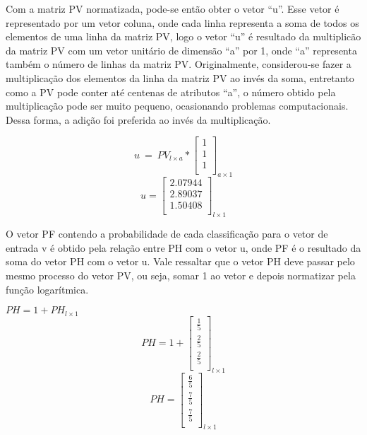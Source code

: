 \begin{anexosenv}
Com a matriz PV normatizada, pode-se então obter o vetor ``u''. Esse vetor é
representado por um vetor coluna, onde cada linha representa a soma de todos os
elementos de uma linha da matriz PV, logo o vetor ``u'' é resultado da multiplicão
da matriz PV com um vetor unitário de dimensão ``a'' por 1, onde ``a'' representa
também o número de linhas da matriz PV. Originalmente, considerou-se fazer a
multiplicação dos elementos da linha da matriz PV ao invés da soma, entretanto
como a PV pode conter até centenas de atributos ``a'', o número obtido pela
multiplicação pode ser muito pequeno, ocasionando problemas computacionais.
Dessa forma, a adição foi preferida ao invés da multiplicação.

\begin{center}
$$u \ = \ PV _{l \times a} * \left[
\begin{array}{c}
1 \\
1 \\
1 \\
\end{array}
\right]_{a \times 1}$$
$$u=\left[
\begin{array}{c}
2.07944 \\
2.89037 \\
1.50408 \\
\end{array}
\right]_{l \times 1}$$
\end{center}

O vetor PF contendo a probabilidade de cada classificação para o vetor de
entrada v é obtido pela relação entre PH com o vetor u, onde PF é o resultado
da soma do vetor PH com o vetor u. Vale ressaltar que o vetor PH deve passar
pelo mesmo processo do vetor PV, ou seja, somar 1 ao vetor e depois normatizar
pela função logarítmica.

\begin{center}
$PH = 1 + PH_{l \times 1}$
$$PH=1 + \left[
\begin{array}{c}
\frac{1}{5} \\
\frac{2}{5} \\
\frac{2}{5} \\
\end{array}
\right]_{l \times 1}$$
$$PH=\left[
\begin{array}{c}
\frac{6}{5} \\
\frac{7}{5} \\
\frac{7}{5} \\
\end{array}
\right]_{l \times 1}$$
\end{center}


\end{anexosenv}

